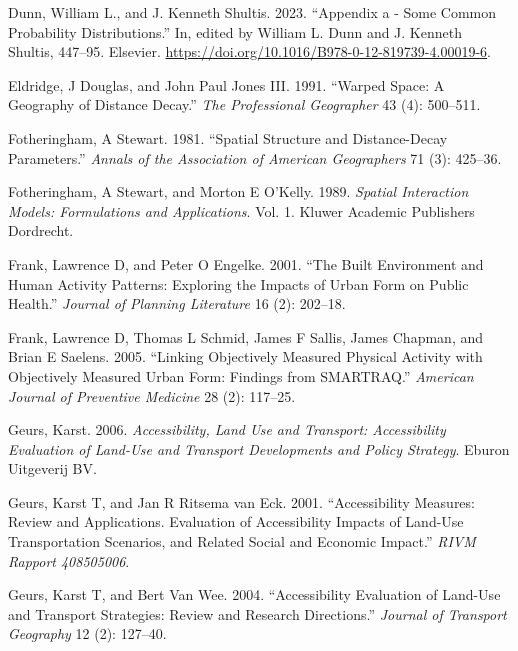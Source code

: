 \documentclass[preprint, 3p,
authoryear]{elsarticle} %
\newlength{\cslhangindent}
\newlength{\cslentryspacingunit} %
\newenvironment{CSLReferences}[2] %
 {%
  \setlength{\parindent}{0pt}
  \ifodd #1
  \let\oldpar\par
  \def\par{\hangindent=\cslhangindent\oldpar}
  \fi
  \setlength{\parskip}{#2\cslentryspacingunit}
 }%
 {}
\begin{document}
\begin{CSLReferences}{1}{0}
\leavevmode{}%
Dunn, William L., and J. Kenneth Shultis. 2023. {``Appendix a - Some
Common Probability Distributions.''} In, edited by William L. Dunn and
J. Kenneth Shultis, 447--95. Elsevier.
\url{https://doi.org/10.1016/B978-0-12-819739-4.00019-6}.

\leavevmode{}%
Eldridge, J Douglas, and John Paul Jones III. 1991. {``Warped Space: A
Geography of Distance Decay.''} \emph{The Professional Geographer} 43
(4): 500--511.

\leavevmode{}%
Fotheringham, A Stewart. 1981. {``Spatial Structure and Distance-Decay
Parameters.''} \emph{Annals of the Association of American Geographers}
71 (3): 425--36.

\leavevmode{}%
Fotheringham, A Stewart, and Morton E O'Kelly. 1989. \emph{Spatial
Interaction Models: Formulations and Applications}. Vol. 1. Kluwer
Academic Publishers Dordrecht.

\leavevmode{}%
Frank, Lawrence D, and Peter O Engelke. 2001. {``The Built Environment
and Human Activity Patterns: Exploring the Impacts of Urban Form on
Public Health.''} \emph{Journal of Planning Literature} 16 (2): 202--18.

\leavevmode{}%
Frank, Lawrence D, Thomas L Schmid, James F Sallis, James Chapman, and
Brian E Saelens. 2005. {``Linking Objectively Measured Physical Activity
with Objectively Measured Urban Form: Findings from SMARTRAQ.''}
\emph{American Journal of Preventive Medicine} 28 (2): 117--25.

\leavevmode{}%
Geurs, Karst. 2006. \emph{Accessibility, Land Use and Transport:
Accessibility Evaluation of Land-Use and Transport Developments and
Policy Strategy}. Eburon Uitgeverij BV.

\leavevmode{}%
Geurs, Karst T, and Jan R Ritsema van Eck. 2001. {``Accessibility
Measures: Review and Applications. Evaluation of Accessibility Impacts
of Land-Use Transportation Scenarios, and Related Social and Economic
Impact.''} \emph{RIVM Rapport 408505006}.

\leavevmode{}%
Geurs, Karst T, and Bert Van Wee. 2004. {``Accessibility Evaluation of
Land-Use and Transport Strategies: Review and Research Directions.''}
\emph{Journal of Transport Geography} 12 (2): 127--40.


\end{CSLReferences}
\end{document}
